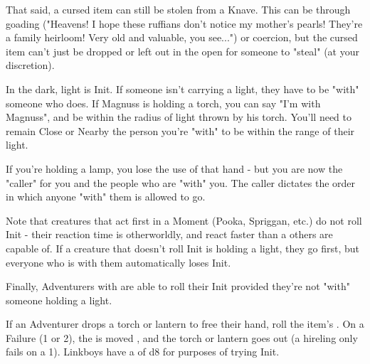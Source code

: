 {That said, a cursed item can still be stolen from a Knave.  This can be through goading ("Heavens!  I hope these ruffians don't notice my mother's pearls!  They're a family heirloom!  Very old and valuable, you see...") or coercion, but the cursed item can't just be dropped or left out in the open for someone to "steal" (at your discretion).

\newpage




In the dark, light is Init.  If someone isn't carrying a light, they have to be "with" someone who does.  If Magnuss is holding a torch, you can say "I'm with Magnuss", and be within the radius of light thrown by his torch.  You'll need to remain Close or Nearby the person you're "with" to be within the range of their light.

If you're holding a lamp, you lose the use of that hand - but you are now the "caller" for you and the people who are "with" you.   The caller dictates the order in which anyone "with" them is allowed to go.


Note that creatures that act first in a Moment (Pooka, Spriggan, etc.) do not roll Init - their reaction time is otherworldly, and react faster than a others are capable of.  If a creature that doesn't roll Init is holding a light, they go first, but everyone who is with them automatically loses Init.

Finally, Adventurers with  are able to roll their Init provided they're not "with" someone holding a light.

If an Adventurer drops a torch or lantern to free their hand, roll the item's \UD\@.  On a Failure (1 or 2), the \UD is moved \DCDOWN, and the torch or lantern goes out (a hireling  only fails on a 1). Linkboys have a \DEX of d8 for purposes of trying Init.

}

